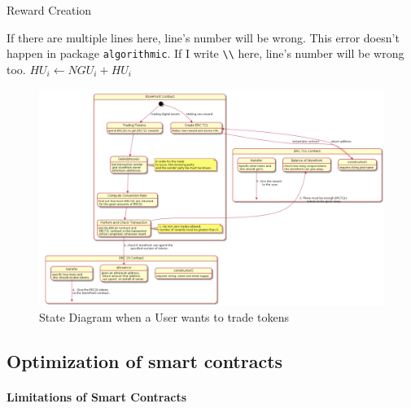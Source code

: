 \documentclass[12pt,tightenlines,letterpaper]{scrartcl}
\begin{document}
 
  \begin{algorithm}[ht]
    \caption{Reward Creation}\label{alg:algorithm2}
    \begin{algorithmic}[1]
      \Require
        \Statex If there are multiple lines here, line's number will be wrong.
        \Statex This error doesn't happen in package \verb|algorithmic|.
      \Ensure
        \Statex If I write \verb|\\| here, line's number will be wrong too.
      \Statex
       
        \State ${\textit{HU}}_{i} \gets {\textit{NGU}}_{i} + {HU}_{i}$ 
      \EndIf
    \end{algorithmic}
  \end{algorithm}
\begin{figure}
\centering
\includegraphics[width=1\linewidth]{StateDiagramENGR003}
\caption{State Diagram when a User wants to trade tokens}
\label{fig:statediagramengr003}
\end{figure}
 \subsection{Optimization of smart contracts}
 
 \paragraph{Limitations of Smart Contracts}
%
\end{document}
